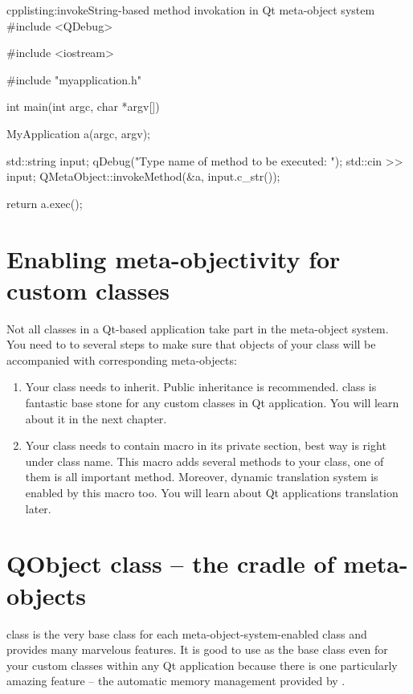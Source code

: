 \begin{fdoccode}{cpp}{listing:invoke}{String-based method invokation in Qt meta-object system}
#include <QDebug>

#include <iostream>

#include "myapplication.h"


int main(int argc, char *argv[]){
    MyApplication a(argc, argv);
    
    std::string input;
    qDebug("Type name of method to be executed: ");
    std::cin >> input;
    QMetaObject::invokeMethod(&a, input.c_str());

    return a.exec();
}
\end{fdoccode}

\section{Enabling meta-objectivity for custom classes}
Not all classes in a Qt-based application take part in the meta-object system. You need to to several steps to make sure that objects of your class will be accompanied with corresponding meta-objects:

\begin{enumerate}
\item Your class needs to inherit. Public inheritance is recommended. class is fantastic base stone for any custom classes in Qt application. You will learn about it in the next chapter.
\item Your class needs to contain macro in its private section, best way is right under class name. This macro adds several methods to your class, one of them is all important method. Moreover, dynamic translation system is enabled by this macro too. You will learn about Qt applications translation later.
\end{enumerate}

\section{QObject class -- the cradle of meta-objects}
 class is the very base class for each meta-object-system-enabled class and provides many marvelous features. It is good to use as the base class even for your custom classes within any Qt application because there is one particularly amazing feature -- the automatic memory management provided by .

